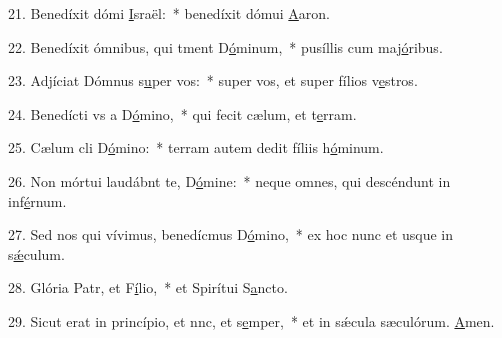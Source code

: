 21. Benedíxit dómi \uline{I}sraël:~* benedíxit dómui \uline{A}aron.\par 
22. Benedíxit ómnibus, qui tment D\uline{ó}minum,~* pusíllis cum maj\uline{ó}ribus.\par 
23. Adjíciat Dómnus s\uline{u}per vos:~* super vos, et super fílios v\uline{e}stros.\par 
24. Benedícti vs a D\uline{ó}mino,~* qui fecit cælum, et t\uline{e}rram.\par 
25. Cælum cli D\uline{ó}mino:~* terram autem dedit fíliis h\uline{ó}minum.\par 
26. Non mórtui laudábnt te, D\uline{ó}mine:~* neque omnes, qui descéndunt in inf\uline{é}rnum.\par 
27. Sed nos qui vívimus, benedícmus D\uline{ó}mino,~* ex hoc nunc et usque in s\uline{ǽ}culum.\par 
28. Glória Patr, et F\uline{í}lio,~* et Spirítui S\uline{a}ncto.\par 
29. Sicut erat in princípio, et nnc, et s\uline{e}mper,~* et in sǽcula sæculórum. \uline{A}men.\par 
